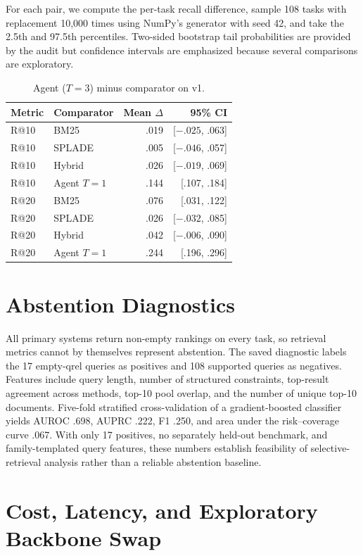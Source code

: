 \documentclass{article}
\begin{document}
For each pair, we compute the per-task recall difference, sample 108 tasks with replacement 10,000 times using NumPy's generator with seed 42, and take the 2.5th and 97.5th percentiles. Two-sided bootstrap tail probabilities are provided by the audit but confidence intervals are emphasized because several comparisons are exploratory.

\begin{table}[h]
\centering
\caption{Agent ($T{=}3$) minus comparator on v1.}
\label{tab:bootstrap}
\small
\begin{tabular}{llrr}
\toprule
Metric & Comparator & Mean $\Delta$ & 95\% CI \\
\midrule
R@10 & BM25 & .019 & [$-.025$, .063] \\
R@10 & SPLADE & .005 & [$-.046$, .057] \\
R@10 & Hybrid & .026 & [$-.019$, .069] \\
R@10 & Agent $T{=}1$ & .144 & [.107, .184] \\
R@20 & BM25 & .076 & [.031, .122] \\
R@20 & SPLADE & .026 & [$-.032$, .085] \\
R@20 & Hybrid & .042 & [$-.006$, .090] \\
R@20 & Agent $T{=}1$ & .244 & [.196, .296] \\
\bottomrule
\end{tabular}
\end{table}

\section{Abstention Diagnostics}
\label{app:abstention}

All primary systems return non-empty rankings on every task, so retrieval metrics cannot by themselves represent abstention. The saved diagnostic labels the 17 empty-qrel queries as positives and 108 supported queries as negatives. Features include query length, number of structured constraints, top-result agreement across methods, top-10 pool overlap, and the number of unique top-10 documents. Five-fold stratified cross-validation of a gradient-boosted classifier yields AUROC .698, AUPRC .222, F1 .250, and area under the risk--coverage curve .067. With only 17 positives, no separately held-out benchmark, and family-templated query features, these numbers establish feasibility of selective-retrieval analysis rather than a reliable abstention baseline.

\section{Cost, Latency, and Exploratory Backbone Swap}
\label{app:cost}
\end{document}

